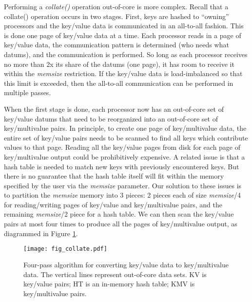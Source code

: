 Performing a {\it collate()} operation out-of-core is more complex.
Recall that a collate() operation occurs in two stages.  First, keys
are hashed to ``owning'' processors and the key/value data is
communicated in an all-to-all fashion.  This is done one page of
key/value data at a time.  Each processor reads in a page of key/value
data, the communication pattern is determined (who needs what datums),
and the communication is performed.  So long as each processor
receives no more than 2x its share of the datums (one page), it has
room to receive it within the {\it memsize} restriction.  If the
key/value data is load-imbalanced so that this limit is exceeded, then
the all-to-all communication can be performed in multiple passes.

When the first stage is done, each processor now has an out-of-core
set of key/value datums that need to be reorganized into an
out-of-core set of key/multivalue pairs.  In principle, to create one
page of key/multivalue data, the entire set of key/value pairs needs
to be scanned to find all keys which contribute values to that page.
Reading all the key/value pages from disk for each page of
key/multivalue output could be prohibitively expensive.  A related
issue is that a hash table is needed to match new keys with previously
encountered keys.  But there is no guarantee that the hash table
itself will fit within the memory specified by the user via the {\it
memsize} parameter.  Our solution to these issues is to partition the
{\it memsize} memory into 3 pieces: 2 pieces each of size {\it
memsize}/4 for reading/writing pages of key/value and key/multivalue
pairs, and the remaining {\it memsize}/2 piece for a hash table.  We
can then scan the key/value pairs at most four times to produce all
the pages of key/multivalue output, as diagrammed in Figure
\ref{f:collate}.

\begin{figure}
\texttt{[image: fig\_collate.pdf]}
\caption{Four-pass algorithm for converting key/value data to
key/multivalue data.  The vertical lines represent out-of-core data
sets.  KV is key/value pairs; HT is an in-memory hash table; KMV is
key/multivalue pairs.}
\label{f:collate}
\end{figure}

